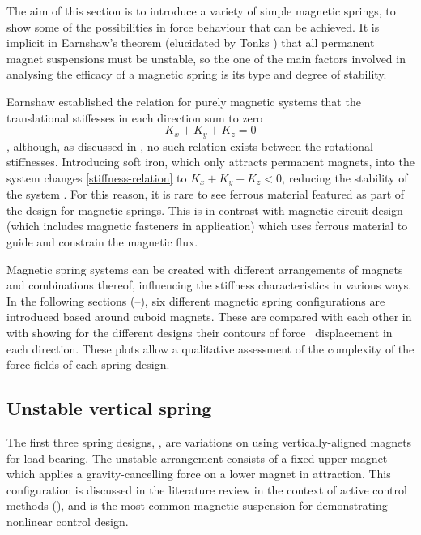 \documentclass[11pt,a4paper]{memoir}
\begin{document}
The aim of this section is to introduce a variety of simple magnetic springs, to show some of the possibilities in force behaviour that can be achieved.
It is implicit in Earnshaw's theorem \cite{earnshaw1842} (elucidated by Tonks \cite{tonks1940}) that all permanent magnet suspensions must be unstable, so the one of the main factors involved in analysing the efficacy of a magnetic spring is its type and degree of stability.

Earnshaw established the relation for purely magnetic systems that the translational stiffesses in each direction sum to zero
\begin{dmath}[label=stiffness-relation]
  K_x+K_y+K_z=0
\end{dmath},
although, as discussed in , no such relation exists between the rotational stiffnesses.
Introducing soft iron, which only attracts permanent magnets, into the system changes \eqref{stiffness-relation} to $K_x+K_y+K_z<0$, reducing the stability of the system \cite[App.\,A]{nijsse2001}.
For this reason, it is rare to see ferrous material featured as part of the design for magnetic springs.
This is in contrast with magnetic circuit design (which includes magnetic fasteners in application) which uses ferrous material to guide and constrain the magnetic flux.

Magnetic spring systems can be created with different arrangements of magnets and combinations thereof, influencing the stiffness characteristics in various ways.
In the following sections (--), six different magnetic spring configurations are introduced based around cuboid magnets.
These are compared with each other in  with  showing for the different designs their contours of force \vs\ displacement in each direction.
These plots allow a qualitative assessment of the complexity of the force fields of each spring design.

\subsection{Unstable vertical spring}

The first three spring designs, , are variations on using vertically-aligned magnets for load bearing.
The unstable arrangement consists of a fixed upper magnet which applies a gravity-cancelling force on a lower magnet in attraction.
This configuration is discussed in the literature review in the context of active control methods (), and is the most common magnetic suspension for demonstrating nonlinear control design.
\end{document}
